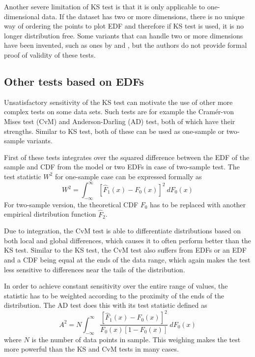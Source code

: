 \documentclass[english, twoside]{HYgradu}
\begin{document}
Another severe limitation of KS test is that it is only applicable to one-dimensional data. If the dataset has two or more dimensions, there is no unique way of ordering the points to plot EDF and therefore if KS test is used, it is no longer distribution free. Some variants that can handle two or more dimensions have been invented, such as ones by \citet{peacock1983twodimensional} and \citet{fasano1987multidimensional}, but the authors do not provide formal proof of validity of these tests.


\subsection{Other tests based on EDFs} \label{sect:edf-tests}
Unsatisfactory sensitivity of the KS test can motivate the use of other more complex tests on some data sets. Such tests are for example the Cram\'er-von Mises test (CvM) and Anderson-Darling (AD) test, both of which have their strengths. Similar to KS test, both of these can be used as one-sample or two-sample variants.  

First of these tests integrates over the squared difference between the EDF of the sample and CDF from the model or two EDFs in case of two-sample test. The test statistic $W^2$ for one-sample case can be expressed formally as
\begin{equation}
	W^2 = \int_{-\infty}^{\infty}[\hat F_1(x) - F_0(x)]^2\ dF_0(x)
\end{equation}
For two-sample version, the theoretical CDF $F_0$ has to be replaced with another empirical distribution function $\hat F_2$.

Due to integration, the CvM test is able to differentiate distributions based on both local and global differences, which causes it to often perform better than the KS test. Similar to the KS test, the CvM test also suffers from EDFs or an EDF and a CDF being equal at the ends of the data range, which again makes the test less sensitive to differences near the tails of the distribution. 

In order to achieve constant sensitivity over the entire range of values, the statistic has to be weighted according to the proximity of the ends of the distribution. The AD test does this with its test statistic defined as
\begin{equation}
	A^2 = N \int_{-\infty}^{\infty} \frac{[\hat F_1(x) - F_0(x)]^2}{F_0(x)[1-F_0(x)]}\ dF_0(x)
\end{equation}
where $N$ is the number of data points in sample. This weighing makes the test more powerful than the KS and CvM tests in many cases. \citep{bohm2010introduction, feigelson2012modern}
\end{document}
